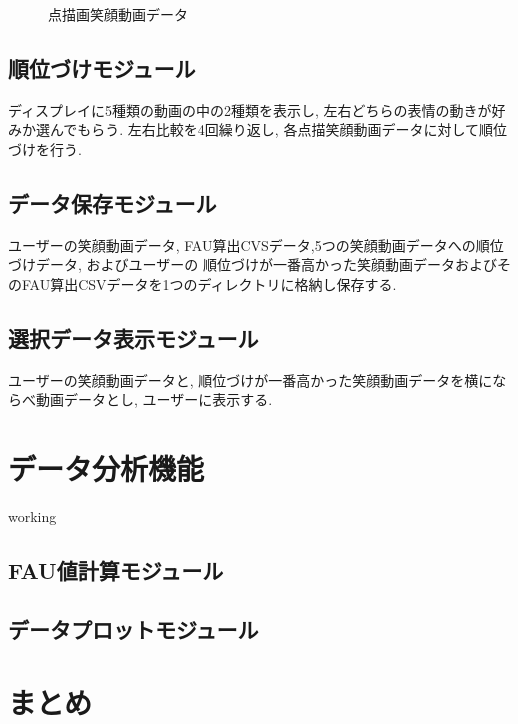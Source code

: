\begin{figure}[htbp]
    \begin{center}
    \end{center}
    \caption{点描画笑顔動画データ}
    \label{fig:showdata}
\end{figure}

\subsection{順位づけモジュール}
ディスプレイに5種類の動画の中の2種類を表示し, 左右どちらの表情の動きが好みか選んでもらう.
左右比較を4回繰り返し, 各点描笑顔動画データに対して順位づけを行う.

\subsection{データ保存モジュール}
ユーザーの笑顔動画データ, FAU算出CVSデータ,5つの笑顔動画データへの順位づけデータ, およびユーザーの
順位づけが一番高かった笑顔動画データおよびそのFAU算出CSVデータを1つのディレクトリに格納し保存する.

\subsection{選択データ表示モジュール}
ユーザーの笑顔動画データと, 順位づけが一番高かった笑顔動画データを横にならべ動画データとし,
ユーザーに表示する.


\section{データ分析機能}
working
\subsection{FAU値計算モジュール}
\subsection{データプロットモジュール}
\section{まとめ}

